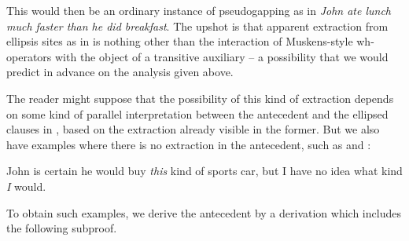 \documentclass[output=paper,colorlinks,citecolor=brown]{langscibook}
\begin{document}
\begin{exe}
 \ex\label{other}
\end{exe}
This would then be an ordinary instance of pseudogapping as in \textit{John
ate lunch much faster than he did breakfast}. The upshot is that
apparent extraction from ellipsis sites as in  is nothing other than
the interaction of Muskens-style wh-operators with the object of a
transitive auxiliary -- a possibility that we would predict in advance
on the analysis given above.

The reader might suppose that the possibility of this kind of
extraction depends on some kind of parallel interpretation between the
antecedent and the ellipsed clauses in , based on the
extraction already visible in the former. But we also have examples
where there is no extraction in the antecedent, such as  and :

\begin{exe}
 \ex\label{noparallel}
  John is certain he would buy \textsl{this} kind of sports car, but I have no
  idea what kind \textsl{I} would.
\end{exe}
To obtain such examples, we derive the antecedent by a derivation
which includes the following subproof.
\end{document}

